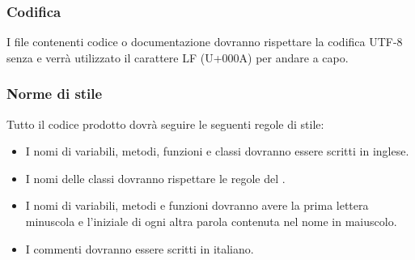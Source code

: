 \subsubsection{Codifica}
\label{sec:2.1.4}
	I file contenenti codice o documentazione dovranno rispettare la codifica UTF-8 senza  e verrà utilizzato il carattere LF (U+000A) per andare a capo.

	\subsubsection{Norme di stile}
	\label{sec:2.1.4.1}
		Tutto il codice prodotto dovrà seguire le seguenti regole di stile:
		\begin{itemize}
			\item I nomi di variabili, metodi, funzioni e classi dovranno essere scritti in inglese.
			\item I nomi delle classi dovranno rispettare le regole del .
			\item I nomi di variabili, metodi e funzioni dovranno avere la prima lettera minuscola e l'iniziale di ogni altra parola contenuta nel nome in maiuscolo.
			\item I commenti dovranno essere scritti in italiano.
		\end{itemize}